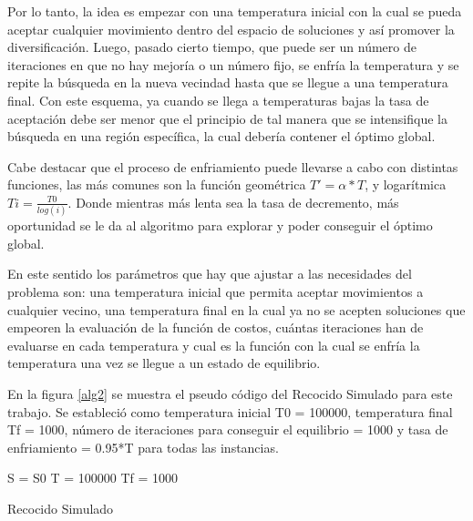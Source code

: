 \documentclass{ci5652}
\begin{document}
Por lo tanto, la idea es empezar con una temperatura inicial con la cual se pueda aceptar cualquier movimiento dentro del espacio de soluciones y así promover la diversificación. Luego, pasado cierto tiempo, que puede ser un número de iteraciones en que no hay mejoría o un número fijo, se enfría la temperatura y se repite la búsqueda en la nueva vecindad hasta que se llegue a una temperatura final. Con este esquema, ya cuando se llega a temperaturas bajas la tasa de aceptación debe ser menor que el principio de tal manera que se intensifique la búsqueda en una región específica, la cual debería contener el óptimo global.

Cabe destacar que el proceso de enfriamiento puede llevarse a cabo con distintas funciones, las más comunes son la función geométrica $ T' = \alpha*T$, y logarítmica $Ti = \frac{T0}{log(i)}$. Donde mientras más lenta sea la tasa de decremento, más oportunidad se le da al algoritmo para explorar y poder conseguir el óptimo global.

En este sentido los parámetros que hay que ajustar a las necesidades del problema son: una temperatura inicial que permita aceptar movimientos a cualquier vecino, una temperatura final en la cual ya no se acepten soluciones que empeoren la evaluación de la función de costos, cuántas iteraciones han de evaluarse en cada temperatura y cual es la función con la cual se enfría la temperatura una vez se llegue a un estado de equilibrio.

En la figura \ref{alg2} se muestra el pseudo código del Recocido Simulado para este trabajo. Se estableció como temperatura inicial T0 = 100000, temperatura final Tf = 1000, número de iteraciones para conseguir el equilibrio = 1000 y tasa de enfriamiento = 0.95*T para todas las instancias.

\begin{algorithm}
 \label{alg2}
 \DontPrintSemicolon
 \vspace*{0.1cm}
 S = S0 
 T = 100000 
 Tf = 1000 
 \vspace*{0.1cm}
 \caption{Recocido Simulado}
\end{algorithm}
\end{document}
